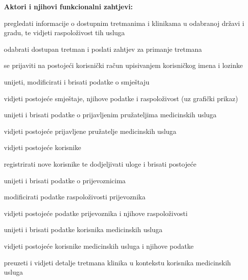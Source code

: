 			\noindent \textbf{Aktori i njihovi funkcionalni zahtjevi:}
			\begin{packed_enum}
				\item  {}
				\begin{packed_enum}
					\item pregledati informacije o dostupnim tretmanima i klinikama u odabranoj državi i gradu, te vidjeti raspoloživost tih usluga
					\item odabrati dostupan tretman i poslati zahtjev za primanje tretmana
					\item se prijaviti na postojeći korisnički račun upisivanjem korisničkog imena i lozinke
				\end{packed_enum}
			
				\item  {}
				\begin{packed_enum}
					\item unijeti, modificirati i brisati podatke o smještaju
					\item vidjeti postojeće smještaje, njihove podatke i raspoloživost (uz grafički prikaz)
					\item unijeti i brisati podatke o prijavljenim pružateljima medicinskih usluga
					\item vidjeti postojeće prijavljene pružatelje medicinskih usluga
					\item vidjeti postojeće korisnike
					\item registrirati nove korisnike te dodjeljivati uloge i brisati postojeće
				\end{packed_enum}
				
				\item  {}
				\begin{packed_enum}
					\item unijeti i brisati podatke o prijevoznicima
					\item modificirati podatke raspoloživosti prijevoznika
					\item vidjeti postojeće podatke prijevoznika i njihove raspoloživosti
				\end{packed_enum}
				
				\item  {}
				\begin{packed_enum}
					\item unijeti i brisati podatke korisnika medicinskih usluga
					\item vidjeti postojeće korisnike medicinskih usluga i njihove podatke
					\item preuzeti i vidjeti detalje tretmana klinika u kontekstu korisnika medicinskih usluga
				\end{packed_enum}
				

\end{packed_enum}
